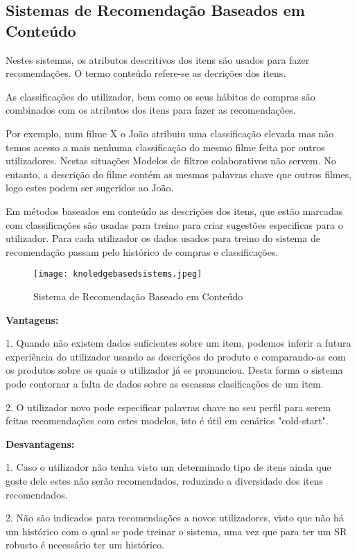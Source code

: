 \hfill
\subsection{Sistemas de Recomendação Baseados em Conteúdo}
\hfill
\par Nestes sistemas, os atributos descritivos dos itens são usados para fazer recomendações. O termo conteúdo refere-se as decrições dos itens. 
\par As classificações do utilizador, bem como os seus hábitos de compras são combinados com os atributos dos itens para fazer as recomendações. 
\par Por exemplo, num filme X o João atribuiu uma classificação elevada mas não temos acesso a mais nenhuma classificação do mesmo filme feita por outros utilizadores. Nestas situações Modelos de filtros colaborativos não servem. No entanto, a descrição do filme contém as mesmas palavras chave que outros filmes, logo estes podem ser sugeridos ao João.
\par Em métodos baseados em conteúdo as descrições dos itens, que estão marcadas com classificações são usadas para treino para criar sugestões especificas para o utilizador. Para cada utilizador os dados usados para treino do sistema de recomendação passam pelo histórico de compras e classificações.\newline


\begin{figure}[H]
  \centering
    \texttt{[image: knoledgebasedsistems.jpeg]}
    \caption{Sistema de Recomendação Baseado em Conteúdo}
    \label{fig03}
\end{figure}

\textbf{Vantagens:}\hfill
\hfill
\par 1. Quando não existem dados suficientes sobre um item, podemos inferir a futura experiência do utilizador usando as descrições do produto e comparando-as com os produtos sobre os quais o utilizador já se pronunciou. Desta forma o sistema pode contornar a falta de dados sobre as escassas clasificações de um item.\newline
\hfill
\par 2. O utilizador novo pode especificar palavras chave no seu perfil para serem feitas recomendações com estes modelos, isto é útil em cenários "cold-start".\newline

\textbf{Desvantagens:}\hfill
\hfill
\par 1. Caso o utilizador não tenha visto um determinado tipo de itens ainda que goste dele estes não serão recomendados, reduzindo a diversidade dos itens recomendados.\newline
\hfill
\par 2. Não são indicados para recomendações a novos utilizadores, visto que não há um histórico com o qual se pode treinar o sistema, uma vez que para ter um SR robusto é necessário ter um histórico.\newline


